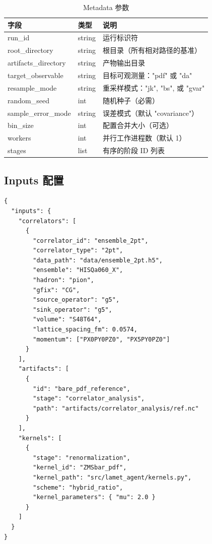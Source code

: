 \documentclass[12pt,a4paper]{ctexart}
\begin{document}
\begin{table}[h]
\centering
\begin{tabular}{@{}>{\ttfamily}lll@{}}
\toprule
\textbf{字段} & \textbf{类型} & \textbf{说明} \\
\midrule
run\_id              & string  & 运行标识符 \\
root\_directory      & string  & 根目录（所有相对路径的基准）\\
artifacts\_directory & string  & 产物输出目录 \\
target\_observable   & string  & 目标可观测量："pdf" 或 "da" \\
resample\_mode       & string  & 重采样模式："jk", "bs", 或 "gvar" \\
random\_seed         & int     & 随机种子（必需）\\
sample\_error\_mode  & string  & 误差模式（默认 "covariance"）\\
bin\_size            & int     & 配置合并大小（可选）\\
workers              & int     & 并行工作进程数（默认 1）\\
stages               & list    & 有序的阶段 ID 列表 \\
\bottomrule
\end{tabular}
\caption{Metadata 参数}
\end{table}

\subsection{Inputs 配置}

\begin{lstlisting}[style=jsoncode]
{
  "inputs": {
    "correlators": [
      {
        "correlator_id": "ensemble_2pt",
        "correlator_type": "2pt",
        "data_path": "data/ensemble_2pt.h5",
        "ensemble": "HISQa060_X",
        "hadron": "pion",
        "gfix": "CG",
        "source_operator": "g5",
        "sink_operator": "g5",
        "volume": "S48T64",
        "lattice_spacing_fm": 0.0574,
        "momentum": ["PX0PY0PZ0", "PX5PY0PZ0"]
      }
    ],
    "artifacts": [
      {
        "id": "bare_pdf_reference",
        "stage": "correlator_analysis",
        "path": "artifacts/correlator_analysis/ref.nc"
      }
    ],
    "kernels": [
      {
        "stage": "renormalization",
        "kernel_id": "ZMSbar_pdf",
        "kernel_path": "src/lamet_agent/kernels.py",
        "scheme": "hybrid_ratio",
        "kernel_parameters": { "mu": 2.0 }
      }
    ]
  }
}
\end{lstlisting}
\end{document}
